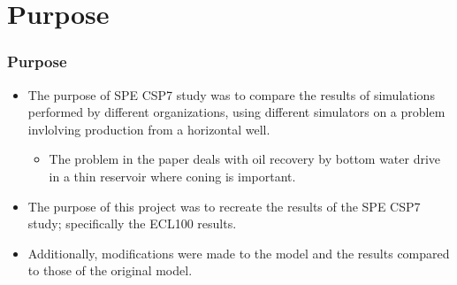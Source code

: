 \section{Purpose}
\begin{frame}
    \frametitle{Purpose}
    \begin{itemize}
        \item The purpose of SPE CSP7 study was to compare the results of simulations performed by different organizations, using different simulators on a problem invlolving production from a horizontal well.
        \pause
        \begin{itemize}
            \item The problem in the paper deals with oil recovery by bottom water drive in a thin reservoir where coning is important. 
        \end{itemize}
        \pause
        \item The purpose of this project was to recreate the results of the SPE CSP7 study; specifically the ECL100 results.
        \item Additionally, modifications were made to the model and the results compared to those of the original model.
    \end{itemize}
\end{frame}
